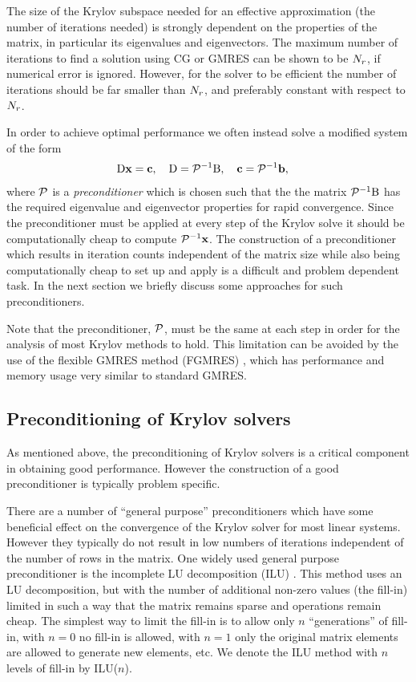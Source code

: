 The size of the Krylov subspace needed for an effective approximation (\ie the number of iterations needed) is strongly dependent on the properties of the matrix, in particular its eigenvalues and eigenvectors.
The maximum number of iterations to find a solution using CG or GMRES can be shown to be $N_r$, if numerical error is ignored.
However, for the solver to be efficient the number of iterations should be far smaller than $N_r$, and preferably constant with respect to $N_r$.

In order to achieve optimal performance we often instead solve a modified system of the form
\begin{equation}
  \begin{aligned}
    \mathrm{D} \boldsymbol{\mathrm{x}} &= {\boldsymbol{\mathrm{c}}}, \quad \mathrm{D} = \mathcal{P}^{-1} \mathrm{B}, \quad {\boldsymbol{\mathrm{c}}} = \mathcal{P}^{-1} {\boldsymbol{\mathrm{b}}},
  \end{aligned}
\end{equation}
where $\mathcal{P}$ is a \emph{preconditioner} which is chosen such that the the matrix $\mathcal{P}^{-1} \mathrm{B}$ has the required eigenvalue and eigenvector properties for rapid convergence.
Since the preconditioner must be applied at every step of the Krylov solve it should be computationally cheap to compute $\mathcal{P}^{-1}\boldsymbol{\mathrm{x}}$.
The construction of a preconditioner which results in iteration counts independent of the matrix size while also being computationally cheap to set up and apply is a difficult and problem dependent task.
In the next section we briefly discuss some approaches for such preconditioners.

Note that the preconditioner, $\mathcal{P}$, must be the same at each step in order for the analysis of most Krylov methods to hold.
This limitation can be avoided by the use of the flexible GMRES method (FGMRES) \cite{Saad1993}, which has performance and memory usage very similar to standard GMRES.


\subsection{Preconditioning of Krylov solvers}
\label{sec:preconditioners}

As mentioned above, the preconditioning of Krylov solvers is a critical component in obtaining good performance.
However the construction of a good preconditioner is typically problem specific.

There are a number of ``general purpose'' preconditioners which have some beneficial effect on the convergence of the Krylov solver for most linear systems.
However they typically do not result in low numbers of iterations independent of the number of rows in the matrix.
One widely used general purpose preconditioner is the incomplete LU decomposition (ILU) \cite[287]{Saad2000}.
This method uses an LU decomposition, but with the number of additional non-zero values (the fill-in) limited in such a way that the matrix remains sparse and operations remain cheap.
The simplest way to limit the fill-in is to allow only $n$ ``generations'' of fill-in, \ie with $n=0$ no fill-in is allowed, with $n=1$ only the original matrix elements are allowed to generate new elements, etc.
We denote the ILU method with $n$ levels of fill-in by ILU($n$).

